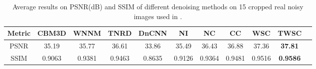 \begin{table}[hbp]
\caption{Average results on PSNR(dB) and SSIM of different denoising methods on 15 cropped real noisy images used in \cite{crosschannel2016}.}
\label{tab5-3}
\begin{center}
\renewcommand\arraystretch{1}
\scriptsize
\begin{tabular*}{1\textwidth}{@{\extracolsep{\fill}}ccccccccccc}
\hline
Metric
&
\textbf{CBM3D}
&
\textbf{WNNM}
&
\textbf{TNRD}
&
\textbf{DnCNN}
&
\textbf{NI}
&
\textbf{NC}
&
\textbf{CC}
&
\textbf{WSC}
&
\textbf{TWSC}
\\
\hline
PSNR & 35.19 & 35.77 & 36.61 & 33.86 & 35.49 & 36.43  & 36.88 & 37.36 & \textbf{37.81}
\\
\hline
SSIM & 0.9063 & 0.9381 & 0.9463 & 0.8635 & 0.9126 & 0.9364 & 0.9481 & 0.9516 & \textbf{0.9586}
\\
\hline
\end{tabular*}
\end{center}
\end{table}


